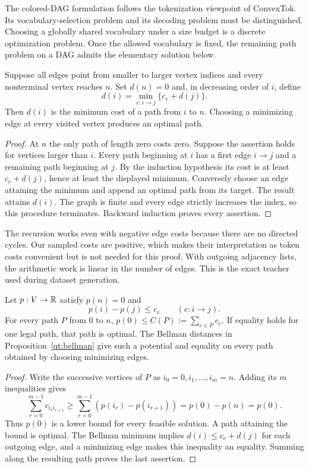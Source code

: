 The colored-DAG formulation follows the tokenization viewpoint of
ConvexTok. Its vocabulary-selection problem and its decoding problem must
be distinguished. Choosing a globally shared vocabulary under a size budget
is a discrete optimization problem. Once the allowed vocabulary is fixed,
the remaining path problem on a DAG admits the elementary solution below.
\cite{qtConvexTok}

\begin{proposition}
\label{qt:bellman}
Suppose all edges point from smaller to larger vertex indices and every
nonterminal vertex reaches $n$. Set $d(n)=0$ and, in decreasing order of $i$,
define
\[
 d(i)=\min_{e:i\to j}\{c_e+d(j)\}.
\]
Then $d(i)$ is the minimum cost of a path from $i$ to $n$. Choosing a
minimizing edge at every visited vertex produces an optimal path.
\end{proposition}
\begin{proof}
At $n$ the only path of length zero costs zero. Suppose the assertion holds
for vertices larger than $i$. Every path beginning at $i$ has a first edge
$i\to j$ and a remaining path beginning at $j$. By the induction hypothesis
its cost is at least $c_e+d(j)$, hence at least the displayed minimum.
Conversely choose an edge attaining the minimum and append an optimal path
from its target. The result attains $d(i)$. The graph is finite and every
edge strictly increases the index, so this procedure terminates. Backward
induction proves every assertion.
\end{proof}

The recursion works even with negative edge costs because there are no
directed cycles. Our sampled costs are positive, which makes their
interpretation as token costs convenient but is not needed for this proof.
With outgoing adjacency lists, the arithmetic work is linear in the number
of edges. This is the exact teacher used during dataset generation.

\begin{proposition}
\label{qt:path-certificate}
Let $p:V\to\mathbb{R}$ satisfy $p(n)=0$ and
\[
 p(i)-p(j)\leq c_e \qquad(e:i\to j).
\]
For every path $P$ from $0$ to $n$,
$p(0)\leq C(P):=\sum_{e\in P}c_e$.
If equality holds for one legal path, that path is optimal.
The Bellman distances in Proposition~\ref{qt:bellman} give such a potential
and equality on every path obtained by choosing minimizing edges.
\end{proposition}
\begin{proof}
Write the successive vertices of $P$ as $i_0=0,i_1,\ldots,i_m=n$.
Adding its $m$ inequalities gives
\[
 \sum_{r=0}^{m-1}c_{i_r i_{r+1}}
 \geq \sum_{r=0}^{m-1}(p(i_r)-p(i_{r+1}))
 =p(0)-p(n)=p(0).
\]
Thus $p(0)$ is a lower bound for every feasible solution. A path attaining
the bound is optimal. The Bellman minimum implies
$d(i)\leq c_e+d(j)$ for each outgoing edge, and a minimizing edge makes
this inequality an equality. Summing along the resulting path proves the
last assertion.
\end{proof}

